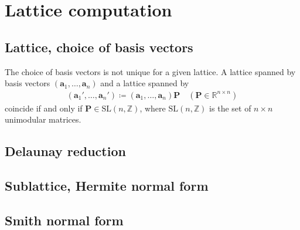 \section{\label{sec:lattice}Lattice computation}

\subsection{Lattice, choice of basis vectors}

The choice of basis vectors is not unique for a given lattice.
A lattice spanned by basis vectors $( \bm{a}_{1}, \dots, \bm{a}_{n} )$ and a lattice spanned by
\begin{align*}
  ( \bm{a}_{1}', \dots, \bm{a}_{n}' ) \coloneqq ( \bm{a}_{1}, \dots, \bm{a}_{n} ) \bm{P} \quad (\bm{P} \in \mathbb{R}^{n \times n})
\end{align*}
coincide if and only if $\bm{P} \in \mathrm{SL}(n, \mathbb{Z})$, where $ \mathrm{SL}(n, \mathbb{Z})$ is the set of $n \times n$ unimodular matrices.

\subsection{Delaunay reduction}

\subsection{Sublattice, Hermite normal form}

\subsection{Smith normal form}
